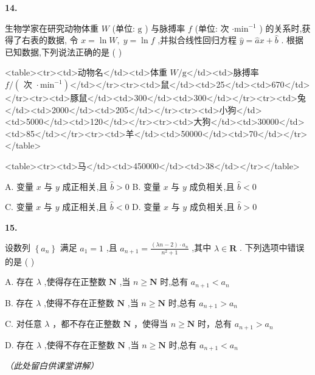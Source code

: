 \documentclass[10pt]{article}
\newcommand{\boardspace}[1]{%
  \par\vspace{#1}
}
\newcommand{\hardboardspace}{%
  \par\vspace{5cm}
  \hfill\textit{（此处留白供课堂讲解）}
  \par\vspace{1cm}
}
\newenvironment{questionblock}[1]{%
  \needspace{3\baselineskip}%
  \noindent\textbf{#1.}%
}{%
  \par\vspace{1em}%
}
\begin{document}
\boardspace{1.5cm}

\begin{questionblock}{14}
生物学家在研究动物体重 \(W\) (单位: \(\mathrm{g}\) ) 与脉搏率 \(f\) (单位: 次 \(\cdot  {\mathrm{{min}}}^{-1}\) ) 的关系时,获得了右表的数据, 令 \(x = \ln W,\;y = \ln f\) ,并拟合线性回归方程 \(\widehat{y} = \widehat{a}x + \widehat{b}\) . 根据已知数据,下列说法正确的是 ( )

<table><tr><td>动物名</td><td>体重 \(W/\mathrm{g}\)</td><td>脉搏率 \(f/\left( {\text{ 次 } \cdot  {\mathrm{{min}}}^{-1}}\right)\)</td></tr><tr><td>鼠</td><td>25</td><td>670</td></tr><tr><td>豚鼠</td><td>300</td><td>300</td></tr><tr><td>兔</td><td>2000</td><td>205</td></tr><tr><td>小狗</td><td>5000</td><td>120</td></tr><tr><td>大狗</td><td>30000</td><td>85</td></tr><tr><td>羊</td><td>50000</td><td>70</td></tr></table>

<table><tr><td>马</td><td>450000</td><td>38</td></tr></table>

A. 变量 \(x\) 与 \(y\) 成正相关,且 \(\widehat{b} > 0\) B. 变量 \(x\) 与 \(y\) 成负相关,且 \(\widehat{b} < 0\)

C. 变量 \(x\) 与 \(y\) 成正相关,且 \(\widehat{b} < 0\) D. 变量 \(x\) 与 \(y\) 成负相关,且 \(\widehat{b} > 0\)
\end{questionblock}

\boardspace{1.5cm}

\begin{questionblock}{15}
设数列 \(\left\{  {a}_{n}\right\}\) 满足 \({a}_{1} = 1\) ,且 \({a}_{n + 1} = \frac{\left( {{\lambda n} - 2}\right)  \cdot  {a}_{n}}{{n}^{2} + 1}\) ,其中 \(\lambda  \in  \mathbf{R}\) . 下列选项中错误的是 ( )

A. 存在 \(\lambda\) ,使得存在正整数 \(\mathbf{N}\) ,当 \(n \geq  \mathbf{N}\) 时,总有 \({a}_{n + 1} < {a}_{n}\)

B. 存在 \(\lambda\) ,使得不存在正整数 \(\mathbf{N}\) ,当 \(n \geq  \mathbf{N}\) 时,总有 \({a}_{n + 1} > {a}_{n}\)

C. 对任意 \(\lambda\) ，都不存在正整数 \(\mathbf{N}\) ，使得当 \(n \geq  \mathbf{N}\) 时，总有 \({a}_{n + 1} > {a}_{n}\)

D. 存在 \(\lambda\) ,使得不存在正整数 \(\mathbf{N}\) ,当 \(n \geq  \mathbf{N}\) 时,总有 \({a}_{n + 1} < {a}_{n}\)
\end{questionblock}

\hardboardspace
\end{document}
